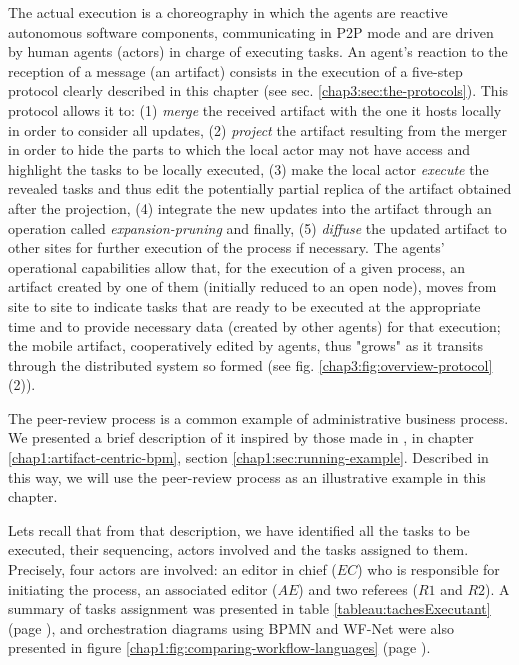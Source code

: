 The actual execution is a choreography in which the agents are reactive autonomous software components, communicating in P2P mode and are  driven by human agents (actors) in charge of executing tasks. An agent's reaction to the reception of a message (an artifact) consists in the execution of a five-step protocol clearly described in this chapter (see sec. \ref{chap3:sec:the-protocols}). 
This protocol allows it to: (1) \textit{merge} the received artifact with the one it hosts locally in order to consider all updates, (2) \textit{project} the artifact resulting from the merger in order to hide the parts to which the local actor may not have access and highlight the tasks to be locally executed, (3) make the local actor \textit{execute} the revealed tasks and thus edit the potentially partial replica of the artifact obtained after the projection, (4) integrate the new updates into the artifact through an operation called \textit{expansion-pruning} and finally, (5) \textit{diffuse} the updated artifact to other sites for further execution of the process if necessary. 
The agents' operational capabilities allow that, for the execution of a given process, an artifact created by one of them (initially reduced to an open node), moves from site to site to indicate tasks that are ready to be executed at the appropriate time and to provide necessary data (created by other agents) for that execution; the mobile artifact, cooperatively edited by agents, thus "grows" as it transits through the distributed system so formed (see fig. \ref{chap3:fig:overview-protocol} (2)).


\label{chap3:sec:running-example}

\label{chap3:sec:peer-review-description}
The peer-review process \cite{peerReview02} is a common example of administrative business process. We presented a brief description of it inspired by those made in \cite{peerReview02, van2001proclets, badouel14}, in chapter \ref{chap1:artifact-centric-bpm}, section \ref{chap1:sec:running-example}. Described in this way, we will use the peer-review process as an illustrative example in this chapter.

Lets recall that from that description, we have identified all the tasks to be executed, their sequencing, actors involved and the tasks assigned to them. Precisely, four actors are involved: an editor in chief ($EC$) who is responsible for initiating the process, an associated editor ($AE$) and two referees ($R1$ and $R2$).
A summary of tasks assignment was presented in table \ref{tableau:tachesExecutant} (page \pageref{tableau:tachesExecutant}), and orchestration diagrams using BPMN and WF-Net were also presented in figure \ref{chap1:fig:comparing-workflow-languages} (page \pageref{chap1:fig:comparing-workflow-languages}).


